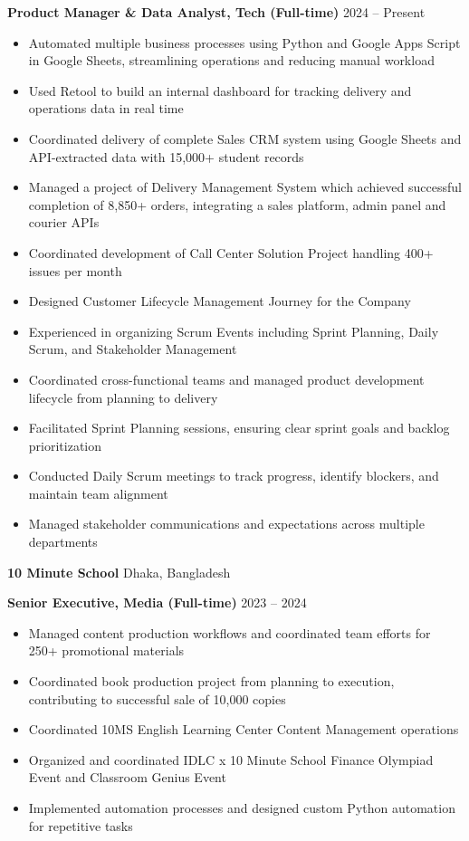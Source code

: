 \documentclass[11pt]{article}
\begin{document}
\textbf{Product Manager \& Data Analyst, Tech (Full-time)} \hfill 2024 -- Present
\begin{itemize}[noitemsep, topsep=0pt, partopsep=0pt, parsep=0pt]
    \item Automated multiple business processes using Python and Google Apps Script in Google Sheets, streamlining operations and reducing manual workload
    \item Used Retool to build an internal dashboard for tracking delivery and operations data in real time
    \item Coordinated delivery of complete Sales CRM system using Google Sheets and API-extracted data with 15,000+ student records
    \item Managed a project of Delivery Management System which achieved successful completion of 8,850+ orders, integrating a sales platform, admin panel and courier APIs
    \item Coordinated development of Call Center Solution Project handling 400+ issues per month
    \item Designed Customer Lifecycle Management Journey for the Company
    \item Experienced in organizing Scrum Events including Sprint Planning, Daily Scrum, and Stakeholder Management
    \item Coordinated cross-functional teams and managed product development lifecycle from planning to delivery
    \item Facilitated Sprint Planning sessions, ensuring clear sprint goals and backlog prioritization
    \item Conducted Daily Scrum meetings to track progress, identify blockers, and maintain team alignment
    \item Managed stakeholder communications and expectations across multiple departments
\end{itemize}

\vspace{4pt}

\textbf{10 Minute School} \hfill Dhaka, Bangladesh

\textbf{Senior Executive, Media (Full-time)} \hfill 2023 -- 2024
\begin{itemize}[noitemsep, topsep=0pt, partopsep=0pt, parsep=0pt]
    \item Managed content production workflows and coordinated team efforts for 250+ promotional materials
    \item Coordinated book production project from planning to execution, contributing to successful sale of 10,000 copies
    \item Coordinated 10MS English Learning Center Content Management operations
    \item Organized and coordinated IDLC x 10 Minute School Finance Olympiad Event and Classroom Genius Event
    \item Implemented automation processes and designed custom Python automation for repetitive tasks
    
\end{itemize}
\end{document}
